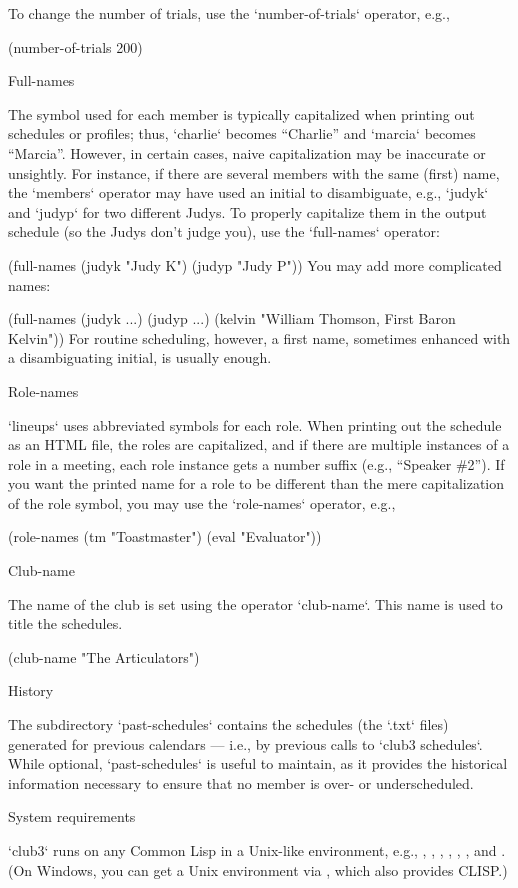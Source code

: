 To change the number of trials, use the `number-of-trials` operator, e.g.,

\begintt
(number-of-trials 200)
\endtt

\beginsection Full-names

The symbol used for each member is typically capitalized  when printing
out schedules or profiles; thus, `charlie` becomes “Charlie” and `marcia`
becomes “Marcia”.  However, in certain cases, naive capitalization may
be inaccurate or unsightly.  For instance, if there are several members
with the same (first) name, the `members` operator may have used an
initial to disambiguate, e.g., `judyk` and `judyp` for two different Judys.
To properly capitalize them in the output schedule (so the Judys don’t
judge you), use the `full-names` operator:

\begintt
(full-names (judyk "Judy K")
            (judyp "Judy P"))
\endtt
You may add more complicated names:

\begintt
(full-names (judyk ...)
            (judyp ...)
            (kelvin "William Thomson, First Baron Kelvin"))
\endtt
For routine scheduling, however, a first name, sometimes enhanced with a
disambiguating initial, is usually
enough.

\beginsection Role-names

`lineups` uses abbreviated symbols for each role.  When printing out the
schedule as an HTML file, the roles are capitalized, and if there are
multiple instances of a role in a meeting, each role instance gets a number suffix
(e.g., “Speaker \#2”).  If you want the printed name for a role to be
different than the mere capitalization of the role symbol, you may use
the `role-names` operator, e.g.,

\begintt
(role-names (tm "Toastmaster")
            (eval "Evaluator"))
\endtt

\beginsection Club-name

The name of the club is set using the operator `club-name`.  This name is
used to title the schedules.

\begintt
(club-name "The Articulators")
\endtt

\beginsection History

The subdirectory `past-schedules` contains the schedules (the `.txt` files)
generated for previous calendars — i.e., by previous calls to `club3 schedules`.  While optional, `past-schedules` is useful to maintain, as
it provides the historical information necessary to ensure that no
member is over- or underscheduled.

\beginsection System requirements

`club3` runs on any Common Lisp in a Unix-like environment, e.g.,
,
,
,
,
,
, and
.
(On Windows, you can get a Unix
environment via , which also
provides CLISP.)

\bye

